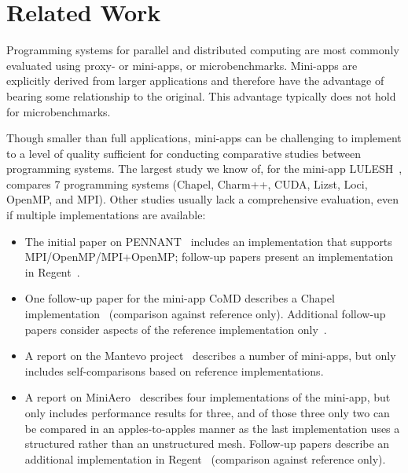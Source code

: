 \section{Related Work}
\label{sec:related-work}

Programming systems for parallel and distributed computing are most
commonly evaluated using proxy- or mini-apps, or
micro\-benchmarks. Mini-apps are explicitly derived from larger
applications and therefore have the advantage of bearing some
relationship to the original. This advantage typically does not hold
for microbenchmarks.

Though smaller than full applications, mini-apps can be challenging to
implement to a level of quality sufficient for conducting comparative
studies between programming systems. The largest study we know of,
for the mini-app LULESH~\cite{LULESH13}, compares 7 programming
systems (Chapel, Charm++, CUDA, Lizst, Loci, OpenMP, and MPI). Other
studies usually lack a comprehensive evaluation, even if multiple
implementations are available:

\begin{itemize}

\item
The initial paper on PENNANT~\cite{PENNANT} includes an
implementation that supports MPI/OpenMP/MPI+OpenMP; follow-up papers present an implementation in
Regent~\cite{Regent15, ControlReplication17, LegionTracing18}.

\item
One follow-up paper for the mini-app CoMD describes a Chapel
implementation~\cite{CoMDChapel16} (comparison against reference
only). Additional follow-up papers consider aspects of the reference
implementation only~\cite{CoMDLoadImbalance17,
  CoMDThreadedModels14}.

\item
A report on the Mantevo project~\cite{Mantevo09} describes a number of
mini-apps, but only includes self-comparisons based on reference
implementations.

\item
A report on MiniAero~\cite{SandiaReportManyTaskRuntimes15} describes
four implementations of the mini-app, but only includes performance
results for three, and of those three only two can be compared in an
apples-to-apples manner as the last implementation uses a structured
rather than an unstructured mesh. Follow-up papers describe an
additional implementation in Regent~\cite{Regent15,
  ControlReplication17, LegionTracing18} (comparison against reference
only).

\end{itemize}

